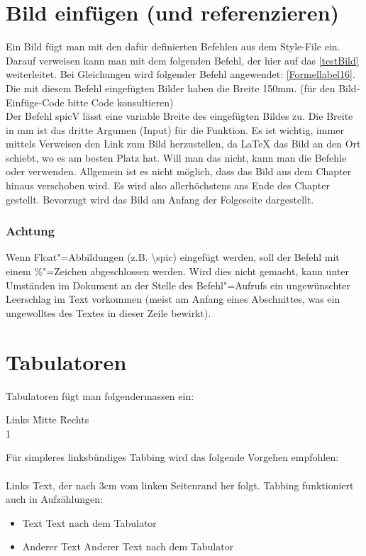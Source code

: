 \section{Bild einfügen (und referenzieren)}%
%
Ein Bild fügt man mit den dafür definierten Befehlen aus dem Style-File ein. Darauf verweisen kann man mit dem folgenden Befehl, der hier auf das \autoref{testBild} weiterleitet. Bei Gleichungen wird folgender Befehl angewendet: \eqref{Formellabel16}. Die mit diesem Befehl eingefügten Bilder haben die Breite 150mm. (für den Bild-Einfüge-Code bitte Code konsultieren)\\%
%
%
%
Der Befehl spicV lässt eine variable Breite des eingefügten Bildes zu. Die Breite in mm ist das dritte Argumen (Input) für die Funktion.%
%
Es ist wichtig, immer mittels Verweisen den Link zum Bild herzustellen, da \LaTeX{} das Bild an den Ort schiebt, wo es am besten Platz hat. Will man das nicht, kann man die Befehle  oder  verwenden.%
%
%
Allgemein ist es nicht möglich, dass das Bild aus dem Chapter hinaus verschoben wird. Es wird also allerhöchstens ans Ende des Chapter gestellt. Bevorzugt wird das Bild am Anfang der Folgeseite dargestellt.  %
%
\subsubsection{Achtung}%
%
Wenn Float"=Abbildungen (z.B. \textbackslash spic) eingefügt werden, soll der Befehl mit einem \%"=Zeichen abgeschlossen werden. Wird dies nicht gemacht, kann unter Umständen im Dokument an der Stelle des Befehl"=Aufrufs ein ungewünschter Leerschlag im Text vorkommen (meist am Anfang eines Abschnittes, was ein ungewolltes  des Textes in dieser Zeile bewirkt).%
%
%
%
%
%
\section{Tabulatoren}%
%
Tabulatoren fügt man folgendermassen ein:%
%
\begin{tabbing}
    Links \= Mitte \= Rechts \\
    1   \\
\end{tabbing}
%
Für simpleres linksbündiges Tabbing wird das folgende Vorgehen empfohlen:\\ \\%
%
Links \tabto{3cm}Text, der nach 3cm vom linken Seitenrand her folgt.%
%
Tabbing funktioniert auch in Aufzählungen:%
%
\begin{itemize}%
\item Text \tabto{5cm} Text nach dem Tabulator%
\item Anderer Text \tabto{5cm} Anderer Text nach dem Tabulator%
\end{itemize}%
%

